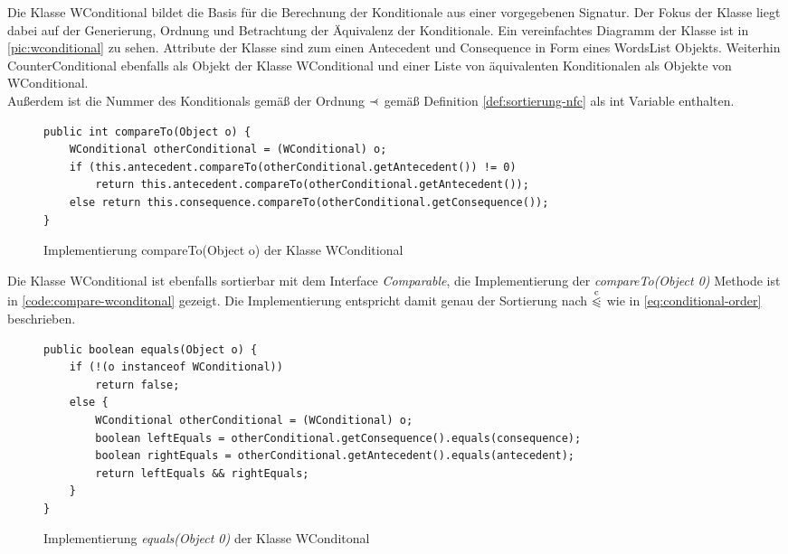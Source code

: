\documentclass[12pt,a4paper]{article}
\newcommand\dotll{\mathrel{%
    \mathchoice{\QEQQ}{\QEQQ}{\QEQQ}{\QEQQ}%
}}
\def\QEQQ{{%
    \setbox0\hbox{$\leqslant$}%
    \rlap{\hbox to \wd0{\hss \raisebox {1pt}{$\ \cdot$\hss}}}\box0
}}
\newcommand\rdotl{\mathrel{%
    \mathchoice{\RQEQ}{\RQEQ}{\RQEQ}{\RQEQ}%
}}
\def\RQEQ{{%
    \setbox0\hbox{$\prec$}%
    \rlap{\hbox to \wd0{\hss \raisebox {0.01pt}{$\ \cdot$\hss}}}\box0
}}
\begin{document}
Die Klasse WConditional bildet die Basis für die Berechnung der Konditionale aus einer vorgegebenen Signatur. Der Fokus der Klasse liegt dabei auf der Generierung, Ordnung und Betrachtung der Äquivalenz der Konditionale. Ein vereinfachtes Diagramm der Klasse ist in \autoref{pic:wconditional} zu sehen. Attribute der Klasse sind zum einen Antecedent und Consequence in Form eines WordsList Objekts. Weiterhin CounterConditional ebenfalls als Objekt der Klasse WConditional und einer Liste von äquivalenten Konditionalen als Objekte von WConditional.\\
Außerdem ist die Nummer des Konditionals gemäß der Ordnung $\rdotl$ gemäß Definition \ref{def:sortierung-nfc} als int Variable enthalten. \\



\begin{figure}
\begin{lstlisting}
public int compareTo(Object o) {
    WConditional otherConditional = (WConditional) o;
    if (this.antecedent.compareTo(otherConditional.getAntecedent()) != 0)
        return this.antecedent.compareTo(otherConditional.getAntecedent());
    else return this.consequence.compareTo(otherConditional.getConsequence());
}
\end{lstlisting}
\caption{Implementierung compareTo(Object o) der Klasse WConditional}
\label{code:compare-wconditonal}
\end{figure}


Die Klasse WConditional ist ebenfalls sortierbar mit dem Interface \textit{Comparable}, die Implementierung der \textit{compareTo(Object 0)} Methode ist in \autoref{code:compare-wconditonal} gezeigt. Die Implementierung entspricht damit genau der Sortierung nach $\overset{\mathrm{c}}{\dotll}$ wie in \autoref{eq:conditional-order} beschrieben.



\begin{figure}
\begin{lstlisting}
public boolean equals(Object o) {
    if (!(o instanceof WConditional))
        return false;
    else {
        WConditional otherConditional = (WConditional) o;
        boolean leftEquals = otherConditional.getConsequence().equals(consequence);
        boolean rightEquals = otherConditional.getAntecedent().equals(antecedent);
        return leftEquals && rightEquals;
    }
}
\end{lstlisting}
\caption{Implementierung \textit{equals(Object 0)} der Klasse WConditonal}
\label{code:equals-wconditonal}
\end{figure}
\end{document}
